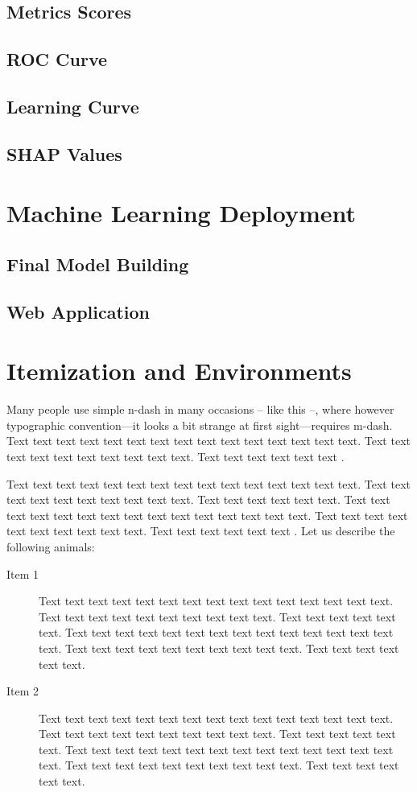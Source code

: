 \subsection{Metrics Scores}
\subsection{ROC Curve}
\subsection{Learning Curve}
\subsection{SHAP Values}
\section{Machine Learning Deployment}
\subsection{Final Model Building}
\subsection{Web Application}

\section{Itemization and Environments}

Many people use simple n-dash in many occasions -- like this --, where however typographic convention---it looks a bit strange at first sight---requires m-dash. Text text text text text text text text text text text text text text text. Text text text text text text text text text text. Text text text text text text \citet{Haufler2006}. 

Text text text text text text text text text text text text text text text. Text text text text text text text text text text. Text text text text text text. Text text text text text text text text text text text text text text text. Text text text text text text text text text text. Text text text text text text \citet{Wells2001}. Let us describe the following animals:

\begin{description}
\item[Item 1] Text text text text text text text text text text text text text text text. Text text text text text text text text text text. Text text text text text text. Text text text text text text text text text text text text text text text. Text text text text text text text text text text. Text text text text text text.
\item[Item 2] Text text text text text text text text text text text text text text text. Text text text text text text text text text text. Text text text text text text. Text text text text text text text text text text text text text text text. Text text text text text text text text text text. Text text text text text text.
\end{description}

